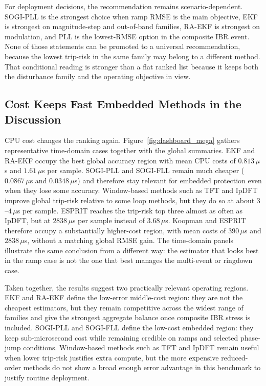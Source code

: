 For deployment decisions, the recommendation remains scenario-dependent.
SOGI-PLL is the strongest
choice when ramp RMSE is the main objective, EKF is strongest on magnitude-step
and out-of-band families, RA-EKF is strongest on modulation, and PLL is the
lowest-RMSE option in the composite IBR event. None of those statements can be
promoted to a universal recommendation, because the lowest trip-risk in the
same family may belong to a different method. That conditional reading is
stronger than a flat ranked list because it keeps both the disturbance family
and the operating objective in view.

\subsection{Cost Keeps Fast Embedded Methods in the Discussion}

CPU cost changes the ranking again. Figure~\ref{fig:dashboard_mega} gathers
representative time-domain cases together with the global summaries. EKF and
RA-EKF occupy the best global accuracy region with mean CPU costs of
$0.813\,\mu$s and $1.61\,\mu$s per sample. SOGI-PLL and SOGI-FLL remain much
cheaper ($0.0867\,\mu$s and $0.0348\,\mu$s) and therefore stay relevant for
embedded protection even when they lose some accuracy. Window-based methods
such as TFT and IpDFT improve global trip-risk relative to some loop methods,
but they do so at about $3$--$4\,\mu$s per sample. ESPRIT reaches the
trip-risk top three almost as often as IpDFT, but at $2838\,\mu$s per sample
instead of $3.68\,\mu$s. Koopman and ESPRIT therefore occupy a substantially
higher-cost region, with mean costs of $390\,\mu$s and $2838\,\mu$s, without a matching
global RMSE gain. The time-domain panels illustrate the same conclusion from a different
way: the estimator that looks best in the ramp case is not the one that best
manages the multi-event or ringdown case.

Taken together, the results suggest two practically relevant operating
regions. EKF and RA-EKF define the low-error middle-cost region: they are not
the cheapest estimators, but they remain competitive across the widest range of
families and give the strongest aggregate balance once composite IBR stress is
included. SOGI-PLL and SOGI-FLL define the low-cost embedded region: they keep
sub-microsecond cost while remaining credible on ramps and selected phase-jump
conditions. Window-based methods such as TFT and IpDFT remain useful when lower
trip-risk justifies extra compute, but the more expensive reduced-order methods
do not show a broad enough error advantage in this benchmark to justify routine
deployment.

